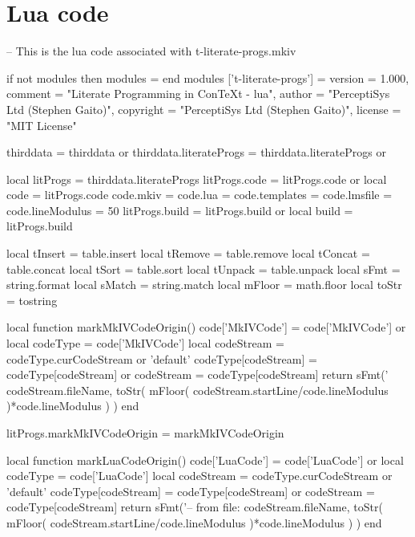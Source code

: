 
\unprotect

\stopMkIVCode

\section{Lua code}

\startLuaCode
-- This is the lua code associated with t-literate-progs.mkiv

if not modules then modules = { } end
modules ['t-literate-progs'] = {
    version   = 1.000,
    comment   = "Literate Programming in ConTeXt - lua",
    author    = "PerceptiSys Ltd (Stephen Gaito)",
    copyright = "PerceptiSys Ltd (Stephen Gaito)",
    license   = "MIT License"
}

thirddata               = thirddata               or {}
thirddata.literateProgs = thirddata.literateProgs or {}

local litProgs   = thirddata.literateProgs
litProgs.code    = litProgs.code or {}
local code       = litProgs.code
code.mkiv        = {}
code.lua         = {}
code.templates   = {}
code.lmsfile     = {}
code.lineModulus = 50
litProgs.build   = litProgs.build or {}
local build      = litProgs.build

local tInsert = table.insert
local tRemove = table.remove
local tConcat = table.concat
local tSort   = table.sort
local tUnpack = table.unpack
local sFmt    = string.format
local sMatch  = string.match
local mFloor  = math.floor
local toStr   = tostring
\stopLuaCode

\startLuaCode
local function markMkIVCodeOrigin()
  code['MkIVCode']     = code['MkIVCode'] or { }
  local codeType       = code['MkIVCode']
  local codeStream     = codeType.curCodeStream or 'default'
  codeType[codeStream] = codeType[codeStream] or { }
  codeStream           = codeType[codeStream]
  return sFmt('%
    codeStream.fileName,
    toStr(
      mFloor(
        codeStream.startLine/code.lineModulus
      )*code.lineModulus
    )
  )
end

litProgs.markMkIVCodeOrigin = markMkIVCodeOrigin

local function markLuaCodeOrigin()
  code['LuaCode']      = code['LuaCode'] or { }
  local codeType       = code['LuaCode']
  local codeStream     = codeType.curCodeStream or 'default'
  codeType[codeStream] = codeType[codeStream] or { }
  codeStream           = codeType[codeStream]
  return sFmt('-- from file: %
    codeStream.fileName,
    toStr(
      mFloor(
        codeStream.startLine/code.lineModulus
      )*code.lineModulus
    )
  )
end

